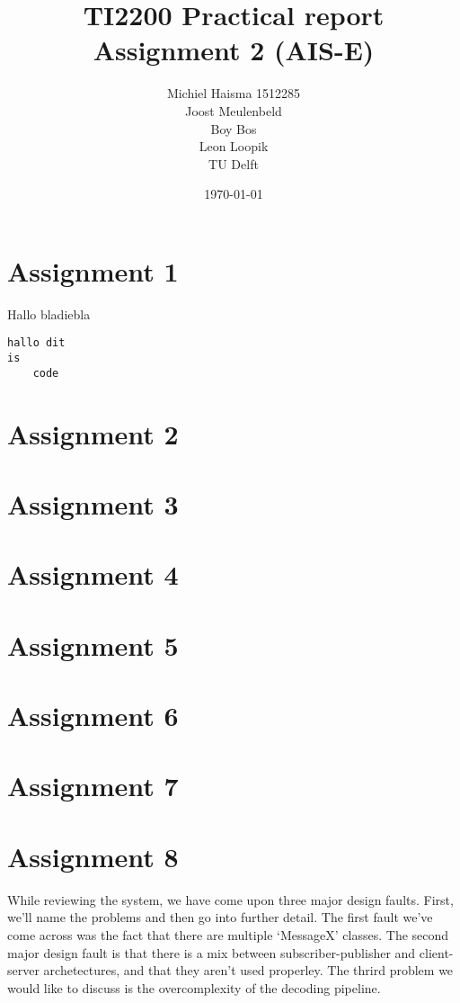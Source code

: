 \documentclass[12pt]{article}
\title{TI2200 Practical report\\
Assignment 2 (AIS-E)}
\author{Michiel Haisma 1512285\\
Joost Meulenbeld\\
Boy Bos\\
Leon Loopik\\
TU Delft\\}
\date{\today}
\begin{document}
\maketitle

\section*{Assignment 1}
Hallo bladiebla

\begin{verbatim}
hallo dit
is 
	code
\end{verbatim}


\section*{Assignment 2}

\section*{Assignment 3}

\section*{Assignment 4}

\section*{Assignment 5}

\section*{Assignment 6}

\section*{Assignment 7}

\section*{Assignment 8}
While reviewing the system, we have come upon three major design faults. First, we'll name the problems and then go into further detail. The first fault we've come across was the fact that there are multiple `MessageX' classes. The second major design fault is that there is a mix between subscriber-publisher and client-server archetectures, and that they aren't used properley. The thrird problem we would like to discuss is the overcomplexity of the decoding pipeline.
\end{document}
